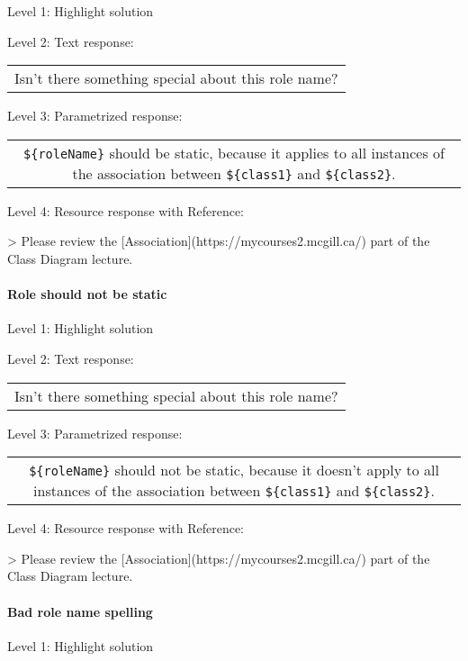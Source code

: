 \noindent Level 1: Highlight solution \medskip

\noindent Level 2: Text response: \medskip

\begin{tabular}{|c}
Isn't there something special about this role name?
\end{tabular} \medskip

\noindent Level 3: Parametrized response: \medskip

\begin{tabular}{|c}
\verb|${roleName}| should be static, because it applies to all instances of the association between \verb|${class1}| and \verb|${class2}|.
\end{tabular} \medskip

\noindent Level 4: Resource response with Reference:

> Please review the [Association](https://mycourses2.mcgill.ca/) part of the Class Diagram lecture.


\paragraph{Role should not be static}

\noindent Level 1: Highlight solution \medskip

\noindent Level 2: Text response: \medskip

\begin{tabular}{|c}
Isn't there something special about this role name?
\end{tabular} \medskip

\noindent Level 3: Parametrized response: \medskip

\begin{tabular}{|c}
\verb|${roleName}| should not be static, because it doesn't apply to all instances of the association between \verb|${class1}| and \verb|${class2}|.
\end{tabular} \medskip

\noindent Level 4: Resource response with Reference:

> Please review the [Association](https://mycourses2.mcgill.ca/) part of the Class Diagram lecture.


\paragraph{Bad role name spelling}

\noindent Level 1: Highlight solution \medskip

